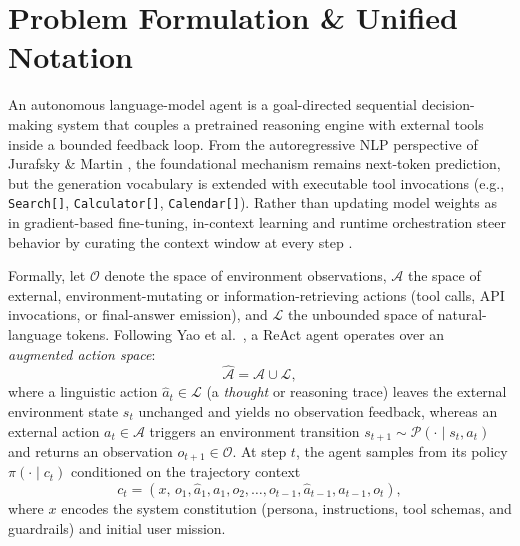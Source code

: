 \documentclass[../../../../master.tex]{subfiles}
\begin{document}

\section{Problem Formulation \& Unified Notation}
\label{sec:agent:formulation}

An autonomous language-model agent is a goal-directed sequential decision-making system that couples a pretrained reasoning engine with external tools inside a bounded feedback loop. From the autoregressive NLP perspective of Jurafsky \& Martin , the foundational mechanism remains next-token prediction, but the generation vocabulary is extended with executable tool invocations (e.g., \texttt{Search[]}, \texttt{Calculator[]}, \texttt{Calendar[]}). Rather than updating model weights as in gradient-based fine-tuning, in-context learning and runtime orchestration steer behavior by curating the context window at every step .

Formally, let $\mathcal{O}$ denote the space of environment observations, $\mathcal{A}$ the space of external, environment-mutating or information-retrieving actions (tool calls, API invocations, or final-answer emission), and $\mathcal{L}$ the unbounded space of natural-language tokens. Following Yao et al.~, a ReAct agent operates over an \emph{augmented action space}:
\begin{equation}
  \hat{\mathcal{A}} = \mathcal{A} \cup \mathcal{L},
  \label{eq:agent:augmented_action_space}
\end{equation}
where a linguistic action $\hat{a}_t \in \mathcal{L}$ (a \emph{thought} or reasoning trace) leaves the external environment state $s_t$ unchanged and yields no observation feedback, whereas an external action $a_t \in \mathcal{A}$ triggers an environment transition $s_{t+1} \sim \mathcal{P}(\cdot \mid s_t, a_t)$ and returns an observation $o_{t+1} \in \mathcal{O}$. At step $t$, the agent samples from its policy $\pi(\cdot \mid c_t)$ conditioned on the trajectory context
\begin{equation}
  c_t = (x,\, o_1, \hat{a}_1, a_1, o_2, \dots, o_{t-1}, \hat{a}_{t-1}, a_{t-1}, o_t),
  \label{eq:agent:trajectory_context}
\end{equation}
where $x$ encodes the system constitution (persona, instructions, tool schemas, and guardrails) and initial user mission.
\end{document}
